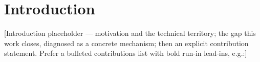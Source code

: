 \section{Introduction}
\label{sec:intro}
[Introduction placeholder — motivation and the technical territory; the gap this work closes, diagnosed
as a concrete mechanism; then an explicit contribution statement. Prefer a bulleted contributions list
with bold run-in lead-ins, e.g.:]

